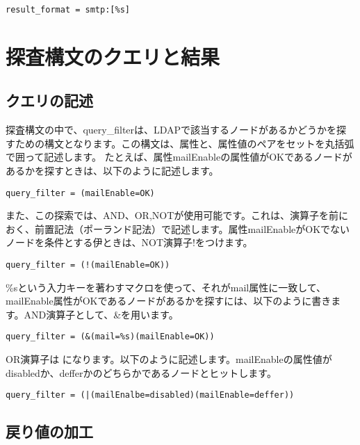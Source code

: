 \begin{verbatim}
result_format = smtp:[%s]
\end{verbatim}

\section{探査構文のクエリと結果}


\subsection{クエリの記述}

探査構文の中で、query\_filterは、LDAPで該当するノードがあるかどうかを探すための構文となります。この構文は、属性と、属性値のペアをセットを丸括弧で囲って記述します。
たとえば、属性mailEnableの属性値がOKであるノードがあるかを探すときは、以下のように記述します。

\begin{verbatim}
query_filter = (mailEnable=OK)
\end{verbatim}

また、この探索では、AND、OR,NOTが使用可能です。これは、演算子を前におく、前置記法（ポーランド記法）で記述します。属性mailEnableがOKでないノードを条件とする伊ときは、NOT演算子!をつけます。

\begin{verbatim}
query_filter = (!(mailEnable=OK))
\end{verbatim}

\%sという入力キーを著わすマクロを使って、それがmail属性に一致して、mailEnable属性がOKであるノードがあるかを探すには、以下のように書きます。AND演算子として、\&を用います。

\begin{verbatim}
query_filter = (&(mail=%s)(mailEnable=OK))
\end{verbatim}

OR演算子は
\textbar
になります。以下のように記述します。mailEnableの属性値がdisabledか、defferかのどちらかであるノードとヒットします。

\begin{verbatim}
query_filter = (|(mailEnalbe=disabled)(mailEnable=deffer))
\end{verbatim}



\subsection{戻り値の加工}

